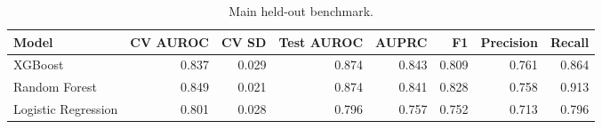 \begin{table}[htbp]
\centering
\caption{Main held-out benchmark.}
\label{tab:main_benchmark_recomputed}
\begin{tabular}{lrrrrrrr}
\toprule
Model & CV AUROC & CV SD & Test AUROC & AUPRC & F1 & Precision & Recall \\
\midrule
XGBoost & 0.837 & 0.029 & 0.874 & 0.843 & 0.809 & 0.761 & 0.864 \\
Random Forest & 0.849 & 0.021 & 0.874 & 0.841 & 0.828 & 0.758 & 0.913 \\
Logistic Regression & 0.801 & 0.028 & 0.796 & 0.757 & 0.752 & 0.713 & 0.796 \\
\bottomrule
\end{tabular}

\end{table}
